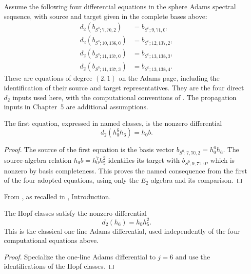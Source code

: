 \begin{theorem}
\label{sem:AdamsComputation:direct-d2-records}
\label{sem:AdamsComputation:direct-d2-h0-six-h6}
Assume the following four differential equations in the sphere Adams
spectral sequence, with source and target given in the complete bases
above:
\[
\begin{aligned}
 d_2(b_{S^0;7,70,2})&=b_{S^0;9,71,0},\\
 d_2(b_{S^0;10,136,0})&=b_{S^0;12,137,2},\\
 d_2(b_{S^0;11,137,0})&=b_{S^0;13,138,3},\\
 d_2(b_{S^0;11,137,3})&=b_{S^0;13,138,4}.
\end{aligned}
\]
These are equations of degree $(2,1)$ on the Adams page, including
the identification of their source and target representatives. They
are the four direct $d_2$ inputs used here, with the computational
conventions of \cite{LinProgram}. The propagation inputs in Chapter~5
are additional assumptions.

The first equation, expressed in named classes, is the nonzero differential
\[
 d_2(h_0^6h_6)=h_0b.
\]
\end{theorem}
\begin{proof}
The source of the first equation is the basis vector
$b_{S^0;7,70,2}=h_0^6h_6$. The source-algebra relation
$h_0b=h_0^7h_5^2$ identifies its target with
$b_{S^0;9,71,0}$, which is nonzero by basis completeness. This proves
the named consequence from the first of the four adopted equations,
using only the $E_2$ algebra and its comparison.
\end{proof}

\begin{theorem}
\label{sem:AdamsComputation:d2-h6-calibration}
From \cite{Adams60}, as recalled in \cite{LWX126}, Introduction.\par
The Hopf classes satisfy the nonzero differential
\[
d_2(h_6)=h_0h_5^2.
\]
This is the classical one-line Adams differential, used independently
of the four computational equations above.
\end{theorem}
\begin{proof}
Specialize the one-line Adams differential to $j=6$ and use the
identifications of the Hopf classes.
\end{proof}

